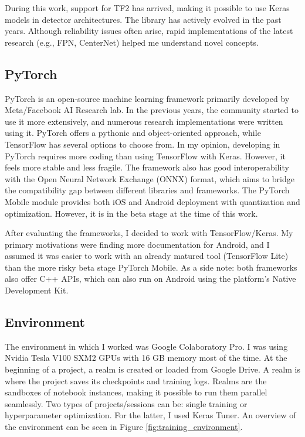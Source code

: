 During this work, support for TF2 has arrived, making it possible to use Keras models in detector architectures. The library has actively evolved in the past years. Although reliability issues often arise, rapid implementations of the latest research (e.g., FPN, CenterNet) helped me understand novel concepts.

\subsection{PyTorch}

PyTorch\cite{PyTorch} is an open-source machine learning framework primarily developed by Meta/Facebook AI Research lab. In the previous years, the community started to use it more extensively, and numerous research implementations were written using it. PyTorch offers a pythonic and object-oriented approach, while TensorFlow has several options to choose from. In my opinion, developing in PyTorch requires more coding than using TensorFlow with Keras. However, it feels more stable and less fragile. The framework also has good interoperability with the Open Neural Network Exchange (ONNX)\cite{ONNX} format, which aims to bridge the compatibility gap between different libraries and frameworks. The PyTorch Mobile module provides both iOS and Android deployment with quantization and optimization. However, it is in the beta stage at the time of this work.

After evaluating the frameworks, I decided to work with TensorFlow/Keras. My primary motivations were finding more documentation for Android, and I assumed it was easier to work with an already matured tool (TensorFlow Lite) than the more risky beta stage PyTorch Mobile. As a side note: both frameworks also offer C++ APIs, which can also run on Android using the platform's Native Development Kit.

\subsection{Environment}

The environment in which I worked was Google Colaboratory Pro. I was using Nvidia Tesla V100 SXM2 GPUs with 16 GB memory most of the time. At the beginning of a project, a realm is created or loaded from Google Drive. A realm is where the project saves its checkpoints and training logs. Realms are the sandboxes of notebook instances, making it possible to run them parallel seamlessly. Two types of projects/sessions can be: single training or hyperparameter optimization. For the latter, I used Keras Tuner. An overview of the environment can be seen in Figure \ref{fig:training_environment}.

